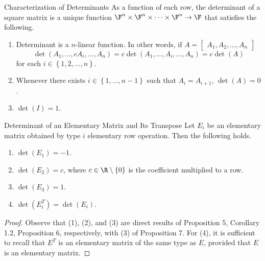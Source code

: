 \documentclass[linearalgebraI]{subfiles}
\begin{document}
    \begin{theorem}{Characterization of Determinants}
        As a function of each row, the determinant of a square matrix is a unique function $\F^n\times \F^n\times\cdots\times\F^n\to \F$ that satisfies the following.
        \begin{enumerate}
            \item Determinant is a $n$-linear function. In other words, if $A = \begin{bmatrix} A_1, A_2, \ldots, A_n\end{bmatrix}$ 
                \begin{equation*}
                    \det (A_1, \ldots, cA_i, \ldots, A_n) = c\det(A_1, \ldots, A_i, \ldots, A_n) = c\det(A)
                \end{equation*}
                for each $i\in \left\lbrace 1, 2, \ldots, n \right\rbrace$.
            \item Whenever there exists $i\in \left\lbrace 1, \ldots, n-1 \right\rbrace$ such that $A_i = A_{i+1}$, $\det(A) = 0$.
            \item $\det(I) = 1$.
        \end{enumerate}
    \end{theorem}

    \clearpage
    \begin{cor}{Determinant of an Elementary Matrix and Its Transpose}
        Let $E_i$ be an elementary matrix obtained by type $i$ elementary row operation. Then the following holds.
        \begin{enumerate}
            \item $\det(E_1) = -1$.
            \item $\det(E_2) = c$, where $c\in \R\setminus \left\lbrace 0 \right\rbrace$ is the coefficient multiplied to a row.
            \item $\det(E_3) = 1$.
            \item $\det\left(E_i^T\right) = \det \left(E_i\right)$.
        \end{enumerate}
    \end{cor}	

    \begin{proof}
        Observe that (1), (2), and (3) are direct results of Proposition 5, Corollary 1.2, Proposition 6, respectively, with (3) of Proposition 7. For (4), it is sufficient to recall that $E^T$ is an elementary matrix of the same type as $E$, provided that $E$ is an elementary matrix.
    \end{proof}
\end{document}

